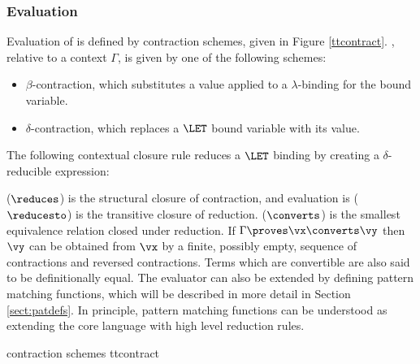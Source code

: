 \subsubsection{Evaluation}

\label{sect:evaluation}

Evaluation of \TT{} is defined by contraction schemes, given in Figure
\ref{ttcontract}. , relative to a context $\Gamma$, is given
by one of the following schemes:

\begin{itemize}
\item $\beta$-contraction, which substitutes a value applied to a $\lambda$-binding for
the bound variable. 
\item $\delta$-contraction, which replaces a $\LET$ bound variable with its value.
\end{itemize}

\noindent
The following contextual closure rule reduces a $\LET$ binding by creating
a $\delta$-reducible expression:


 ($\reduces$) is the structural closure of contraction, and evaluation
is ($\reducesto$) is the transitive closure of reduction.  ($\converts$)
is the smallest equivalence relation closed under reduction. If $\Gamma\proves\vx\converts\vy$
then $\vy$ can be obtained from $\vx$ by a finite, possibly empty, sequence of
contractions and reversed contractions. Terms which are convertible are also said to
be definitionally equal.
The evaluator can also be extended by defining pattern matching functions, which
will be described in more detail in Section \ref{sect:patdefs}. In principle, pattern
matching functions can be understood as extending the core language with high level
reduction rules.

{\TT{} contraction schemes}
{ttcontract}



